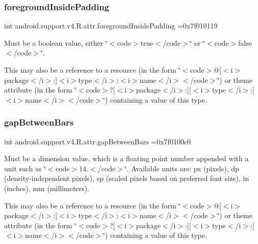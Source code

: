 \subsubsection{\texorpdfstring{foreground\+Inside\+Padding}{foregroundInsidePadding}}
{\footnotesize\ttfamily int android.\+support.\+v4.\+R.\+attr.\+foreground\+Inside\+Padding =0x7f010119\hspace{0.3cm}{\ttfamily [static]}}

Must be a boolean value, either \char`\"{}$<$code$>$true$<$/code$>$\char`\"{} or \char`\"{}$<$code$>$false$<$/code$>$\char`\"{}. 

This may also be a reference to a resource (in the form \char`\"{}$<$code$>$@\mbox{[}$<$i$>$package$<$/i$>$\+:\mbox{]}$<$i$>$type$<$/i$>$\+:$<$i$>$name$<$/i$>$$<$/code$>$\char`\"{}) or theme attribute (in the form \char`\"{}$<$code$>$?\mbox{[}$<$i$>$package$<$/i$>$\+:\mbox{]}\mbox{[}$<$i$>$type$<$/i$>$\+:\mbox{]}$<$i$>$name$<$/i$>$$<$/code$>$\char`\"{}) containing a value of this type. \mbox{\label{classandroid_1_1support_1_1v4_1_1R_1_1attr_a2816042f891807fadc5b644a75c9857f}} 
\subsubsection{\texorpdfstring{gap\+Between\+Bars}{gapBetweenBars}}
{\footnotesize\ttfamily int android.\+support.\+v4.\+R.\+attr.\+gap\+Between\+Bars =0x7f0100c0\hspace{0.3cm}{\ttfamily [static]}}

Must be a dimension value, which is a floating point number appended with a unit such as \char`\"{}$<$code$>$14.\+5sp$<$/code$>$\char`\"{}. Available units are\+: px (pixels), dp (density-\/independent pixels), sp (scaled pixels based on preferred font size), in (inches), mm (millimeters). 

This may also be a reference to a resource (in the form \char`\"{}$<$code$>$@\mbox{[}$<$i$>$package$<$/i$>$\+:\mbox{]}$<$i$>$type$<$/i$>$\+:$<$i$>$name$<$/i$>$$<$/code$>$\char`\"{}) or theme attribute (in the form \char`\"{}$<$code$>$?\mbox{[}$<$i$>$package$<$/i$>$\+:\mbox{]}\mbox{[}$<$i$>$type$<$/i$>$\+:\mbox{]}$<$i$>$name$<$/i$>$$<$/code$>$\char`\"{}) containing a value of this type. \mbox{\label{classandroid_1_1support_1_1v4_1_1R_1_1attr_ad09751f3e3e8e8f66d33642b913bc660}} 
